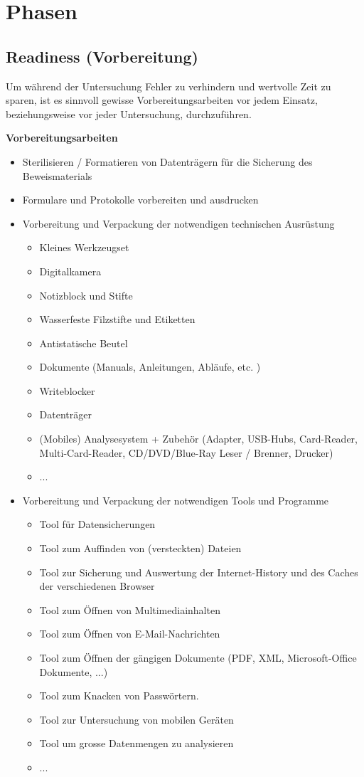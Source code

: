 \section{Phasen}
\subsection{Readiness (Vorbereitung)}
Um während der Untersuchung Fehler zu verhindern und wertvolle Zeit zu sparen, ist es sinnvoll gewisse Vorbereitungsarbeiten vor jedem Einsatz, beziehungsweise vor jeder Untersuchung, durchzuführen.

\textbf{Vorbereitungsarbeiten}
\begin{itemize}
\item Sterilisieren / Formatieren von Datenträgern für die Sicherung des Beweismaterials
\item Formulare und Protokolle vorbereiten und ausdrucken
\item Vorbereitung und Verpackung der notwendigen technischen Ausrüstung
\begin{itemize}
\item Kleines Werkzeugset
\item Digitalkamera
\item Notizblock und Stifte
\item Wasserfeste Filzstifte und Etiketten
\item Antistatische Beutel
\item Dokumente (Manuals, Anleitungen, Abläufe, etc. )
\item Writeblocker
\item Datenträger
\item (Mobiles) Analysesystem + Zubehör (Adapter, USB-Hubs, Card-Reader, Multi-Card-Reader, CD/DVD/Blue-Ray Leser / Brenner, Drucker)
\item ...
\end{itemize}
\item Vorbereitung und Verpackung der notwendigen Tools und Programme
\begin{itemize}
\item Tool für Datensicherungen
\item Tool zum Auffinden von (versteckten) Dateien
\item Tool zur Sicherung und Auswertung der Internet-History und des Caches der verschiedenen Browser
\item Tool zum Öffnen von Multimediainhalten
\item Tool zum Öffnen von E-Mail-Nachrichten
\item Tool zum Öffnen der gängigen Dokumente (PDF, XML, Microsoft-Office Dokumente, ...)
\item Tool zum Knacken von Passwörtern.
\item Tool zur Untersuchung von mobilen Geräten
\item Tool um grosse Datenmengen zu analysieren
\item ...
\end{itemize}
\end{itemize}

